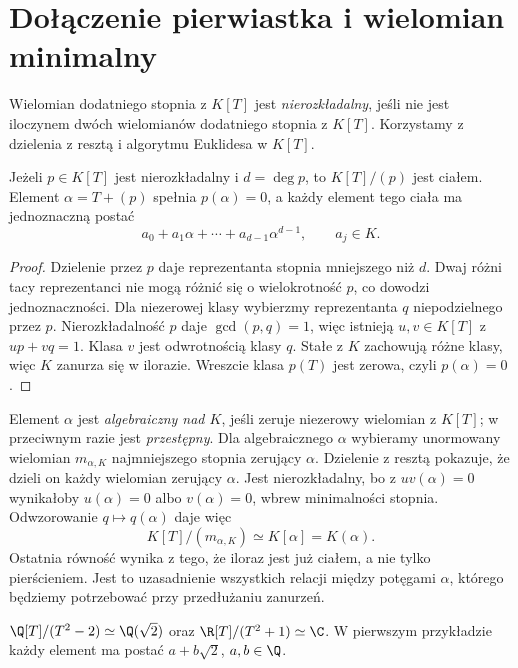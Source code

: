 \section{Dołączenie pierwiastka i wielomian minimalny}

Wielomian dodatniego stopnia z $K[T]$ jest \emph{nierozkładalny}, jeśli nie jest iloczynem dwóch wielomianów dodatniego stopnia z $K[T]$. Korzystamy z dzielenia z resztą i algorytmu Euklidesa w $K[T]$.

\begin{twierdzenie}
Jeżeli $p\in K[T]$ jest nierozkładalny i $d=\deg p$, to $K[T]/(p)$ jest ciałem. Element $\alpha=T+(p)$ spełnia $p(\alpha)=0$, a każdy element tego ciała ma jednoznaczną postać
\[
a_0+a_1\alpha+\cdots+a_{d-1}\alpha^{d-1},\qquad a_j\in K.
\]
\end{twierdzenie}
\begin{proof}
Dzielenie przez $p$ daje reprezentanta stopnia mniejszego niż $d$. Dwaj różni tacy reprezentanci nie mogą różnić się o wielokrotność $p$, co dowodzi jednoznaczności. Dla niezerowej klasy wybierzmy reprezentanta $q$ niepodzielnego przez $p$. Nierozkładalność $p$ daje $\gcd(p,q)=1$, więc istnieją $u,v\in K[T]$ z $up+vq=1$. Klasa $v$ jest odwrotnością klasy $q$. Stałe z $K$ zachowują różne klasy, więc $K$ zanurza się w ilorazie. Wreszcie klasa $p(T)$ jest zerowa, czyli $p(\alpha)=0$.
\end{proof}

Element $\alpha$ jest \emph{algebraiczny nad $K$}, jeśli zeruje niezerowy wielomian z $K[T]$; w przeciwnym razie jest \emph{przestępny}. Dla algebraicznego $\alpha$ wybieramy unormowany wielomian $m_{\alpha,K}$ najmniejszego stopnia zerujący $\alpha$. Dzielenie z resztą pokazuje, że dzieli on każdy wielomian zerujący $\alpha$. Jest nierozkładalny, bo z $uv(\alpha)=0$ wynikałoby $u(\alpha)=0$ albo $v(\alpha)=0$, wbrew minimalności stopnia. Odwzorowanie $q\mapsto q(\alpha)$ daje więc
\[
K[T]/(m_{\alpha,K})\simeq K[\alpha]=K(\alpha).
\]
Ostatnia równość wynika z tego, że iloraz jest już ciałem, a nie tylko pierścieniem. Jest to uzasadnienie wszystkich relacji między potęgami $\alpha$, którego będziemy potrzebować przy przedłużaniu zanurzeń.

\begin{przyklad}
$\Q[T]/(T^2-2)\simeq\Q(\sqrt2)$ oraz $\R[T]/(T^2+1)\simeq\C$. W pierwszym przykładzie każdy element ma postać $a+b\sqrt2$, $a,b\in\Q$.
\end{przyklad}

